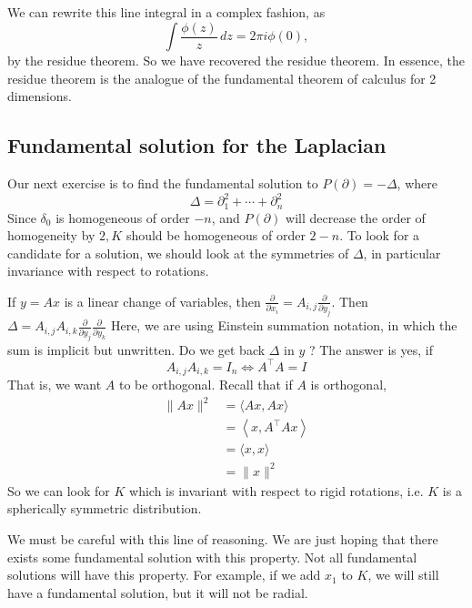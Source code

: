 \begin{remark}
We can rewrite this line integral in a complex fashion, as
\[
    \int \frac{\phi(z)}{z}\,dz = 2\pi i \phi(0),
\]
by the residue theorem. So we have recovered the residue theorem. In essence, the residue theorem is the analogue of the fundamental theorem of calculus for 2 dimensions.
\end{remark}

\subsection{Fundamental solution for the Laplacian}

Our next exercise is to find the fundamental solution to $P(\partial)=-\Delta$, where
$$
\Delta=\partial_{1}^{2}+\cdots+\partial_{n}^{2}
$$
Since $\delta_{0}$ is homogeneous of order $-n$, and $P(\partial)$ will decrease the order of homogeneity by $2, K$ should be homogeneous of order $2-n$. To look for a candidate for a solution, we should look at the symmetries of $\Delta$, in particular invariance with respect to rotations.

If $y=A x$ is a linear change of variables, then $\frac{\partial}{\partial x_{i}}=A_{i, j} \frac{\partial}{\partial y_{j}} .$ Then $\Delta=A_{i, j} A_{i, k} \frac{\partial}{\partial y_{j}} \frac{\partial}{\partial y_{k}}$ Here, we are using Einstein summation notation, in which the sum is implicit but unwritten. Do we get back $\Delta$ in $y$ ? The answer is yes, if
$$
A_{i, j} A_{i, k}=I_{n} \Longleftrightarrow A^{\top} A=I
$$
That is, we want $A$ to be orthogonal. Recall that if $A$ is orthogonal,
$$
\begin{aligned}
\|A x\|^{2} &=\langle A x, A x\rangle \\
&=\left\langle x, A^{\top} A x\right\rangle \\
&=\langle x, x\rangle \\
&=\|x\|^{2}
\end{aligned}
$$
So we can look for $K$ which is invariant with respect to rigid rotations, i.e. $K$ is a spherically symmetric distribution.

\begin{remark}
We must be careful with this line of reasoning. We are just hoping that there exists some fundamental solution with this property. Not all fundamental solutions will have this property. For example, if we add $x_{1}$ to $K$, we will still have a fundamental solution, but it will not be radial.
\end{remark}

